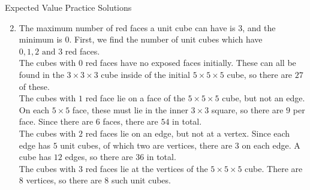 \documentclass[9pt]{beamer}
\begin{document}
\begin{frame}[t]{Expected Value Practice Solutions}
    \begin{enumerate}
    \setcounter{enumi}{1}
        \item The maximum number of red faces a unit cube can have is $3$, and the minimum is $0$. First, we find the number of unit cubes which have $0,1,2\text{ and } 3$ red faces.\\
        \bigskip
        The cubes with $0$ red faces have no exposed faces initially. These can all be found in the $3\times3\times3$ cube inside of the initial $5\times5\times5$ cube, so there are $27$ of these.\\
        The cubes with $1$ red face lie on a face of the $5\times5\times5$ cube, but not an edge. On each $5\times 5$ face, these must lie in the inner $3\times 3$ square, so there are $9$ per face. Since there are $6$ faces, there are $54$ in total.\\
        The cubes with $2$ red faces lie on an edge, but not at a vertex. Since each edge has $5$ unit cubes, of which two are vertices, there are $3$ on each edge. A cube has $12$ edges, so there are $36$ in total.\\
        The cubes with $3$ red faces lie at the vertices of the $5\times5\times5$ cube. There are $8$ vertices, so there are $8$ such unit cubes. \\
        
    \end{enumerate}
    
\end{frame}
\end{document}
